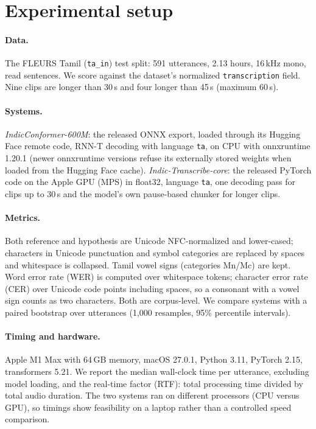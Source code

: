 \documentclass[11pt]{article}
\begin{document}
\section{Experimental setup}
\label{sec:setup}

\paragraph{Data.} The FLEURS Tamil (\texttt{ta\_in}) test split: 591 utterances, 2.13 hours,
16\,kHz mono, read sentences. We score against the dataset's normalized \texttt{transcription}
field. Nine clips are longer than 30\,s and four longer than 45\,s (maximum 60\,s).

\paragraph{Systems.} \emph{IndicConformer-600M}: the released ONNX export, loaded through its
Hugging Face remote code, RNN-T decoding with language \texttt{ta}, on CPU with onnxruntime 1.20.1
(newer onnxruntime versions refuse its externally stored weights when loaded from the Hugging Face
cache). \emph{Indic-Transcribe-core}: the released PyTorch code on the Apple GPU (MPS) in float32,
language \texttt{ta}, one decoding pass for clips up to 30\,s and the model's own pause-based
chunker for longer clips.

\paragraph{Metrics.} Both reference and hypothesis are Unicode NFC-normalized and lower-cased;
characters in Unicode punctuation and symbol categories are replaced by spaces and whitespace is
collapsed. Tamil vowel signs (categories Mn/Mc) are kept. Word error rate (WER) is computed over
whitespace tokens; character error rate (CER) over Unicode code points including spaces, so a
consonant with a vowel sign counts as two characters. Both are corpus-level. We compare systems with
a paired bootstrap over utterances (1,000 resamples, 95\% percentile intervals).

\paragraph{Timing and hardware.} Apple M1 Max with 64\,GB memory, macOS 27.0.1, Python 3.11,
PyTorch 2.15, transformers 5.21. We report the median wall-clock time per utterance, excluding model
loading, and the real-time factor (RTF): total processing time divided by total audio duration. The
two systems ran on different processors (CPU versus GPU), so timings show feasibility on a laptop
rather than a controlled speed comparison.
\end{document}
